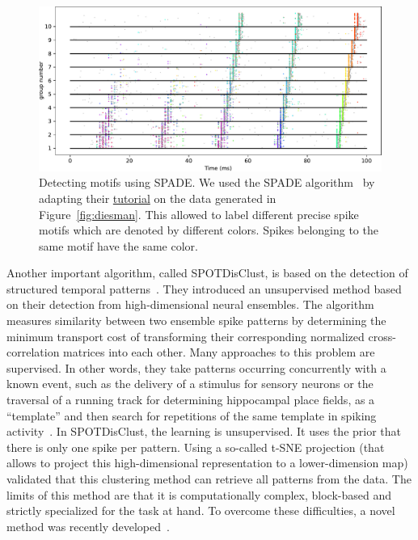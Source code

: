 \documentclass[brainsci, %
               review,accept,pdftex,moreauthors
               ]{Definitions/mdpi}
\begin{document}
\begin{figure}[H]
\includegraphics[width=\linewidth]{figures/Diesmann_et_al_1999_spade.pdf}
\caption{
  Detecting motifs using SPADE. 
  We used the SPADE algorithm~\citep{stella_3d-spade_2019} by adapting their \href{https://elephant.readthedocs.io/en/latest/tutorials/spade.html}{tutorial} on the data generated in  Figure~\ref{fig:diesman}. This allowed to label different precise spike motifs which are denoted by different colors. Spikes belonging to the same motif have the same color. %
}\label{fig:Diesmann_et_al_1999_spade}
\end{figure}

Another important algorithm, called SPOTDisClust, is based on the detection of structured temporal patterns~\citep{grossberger_unsupervised_2018}. They introduced an unsupervised method based on their detection from high-dimensional neural ensembles. The algorithm measures similarity between two ensemble spike patterns by determining the minimum transport cost of transforming their corresponding normalized cross-correlation matrices into each other. Many approaches to this problem are supervised. In other words, they take patterns occurring concurrently with a known event, such as the delivery of a stimulus for sensory neurons or the traversal of a running track for determining hippocampal place fields, as a ``template'' and then search for repetitions of the same template in spiking activity~\citep{nadasdy_replay_1999,lee_combinatorial_2004}. In SPOTDisClust, the learning is unsupervised. It uses the prior that there is only one spike per pattern. Using a so-called t-SNE projection (that allows to project this high-dimensional representation to a lower-dimension map) validated that this clustering method can retrieve all patterns from the data. %
The limits of this method are that it is computationally complex, block-based and strictly specialized for the task at hand. To overcome these difficulties, a novel method was recently developed~\citep{sotomayor-gomez_spikeship_2021}.
\end{document}

